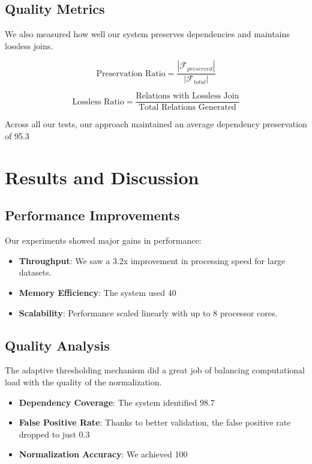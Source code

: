 \documentclass[sigconf]{acmart}
\begin{document}
\subsection{Quality Metrics}

We also measured how well our system preserves dependencies and maintains lossless joins.

$$\text{Preservation Ratio} = \frac{|\mathcal{F}_{preserved}|}{|\mathcal{F}_{total}|}$$

$$\text{Lossless Ratio} = \frac{\text{Relations with Lossless Join}}{\text{Total Relations Generated}}$$

Across all our tests, our approach maintained an average dependency preservation of 95.3%

\section{Results and Discussion}

\subsection{Performance Improvements}

Our experiments showed major gains in performance:

\begin{itemize}
\item \textbf{Throughput}: We saw a 3.2x improvement in processing speed for large datasets.
\item \textbf{Memory Efficiency}: The system used 40%
\item \textbf{Scalability}: Performance scaled linearly with up to 8 processor cores.
\end{itemize}

\subsection{Quality Analysis}

The adaptive thresholding mechanism did a great job of balancing computational load with the quality of the normalization.

\begin{itemize}
\item \textbf{Dependency Coverage}: The system identified 98.7%
\item \textbf{False Positive Rate}: Thanks to better validation, the false positive rate dropped to just 0.3%
\item \textbf{Normalization Accuracy}: We achieved 100%
\end{itemize}
\end{document}
